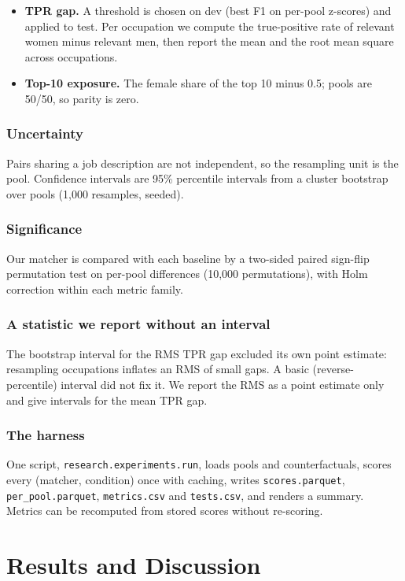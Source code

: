 \documentclass[conference,a4paper]{IEEEtran}
\begin{document}
\begin{itemize}
\item \textbf{TPR gap.} A threshold is chosen on dev (best F1 on per-pool z-scores) and applied to test. Per occupation we compute the true-positive rate of relevant women minus relevant men, then report the mean and the root mean square across occupations.
\item \textbf{Top-10 exposure.} The female share of the top 10 minus 0.5; pools are 50/50, so parity is zero.
\end{itemize}
\subsubsection{Uncertainty} Pairs sharing a job description are not independent, so the resampling unit is the pool. Confidence intervals are 95\% percentile intervals from a cluster bootstrap over pools (1,000 resamples, seeded).

\subsubsection{Significance} Our matcher is compared with each baseline by a two-sided paired sign-flip permutation test on per-pool differences (10,000 permutations), with Holm correction within each metric family.

\subsubsection{A statistic we report without an interval} The bootstrap interval for the RMS TPR gap excluded its own point estimate: resampling occupations inflates an RMS of small gaps. A basic (reverse-percentile) interval did not fix it. We report the RMS as a point estimate only and give intervals for the mean TPR gap.

\subsubsection{The harness} One script, \texttt{research.\allowbreak{}experiments.\allowbreak{}run}, loads pools and counterfactuals, scores every (matcher, condition) once with caching, writes \texttt{scores.\allowbreak{}parquet}, \texttt{per\_\allowbreak{}pool.\allowbreak{}parquet}, \texttt{metrics.\allowbreak{}csv} and \texttt{tests.\allowbreak{}csv}, and renders a summary. Metrics can be recomputed from stored scores without re-scoring.

\section{Results and Discussion}
\end{document}
